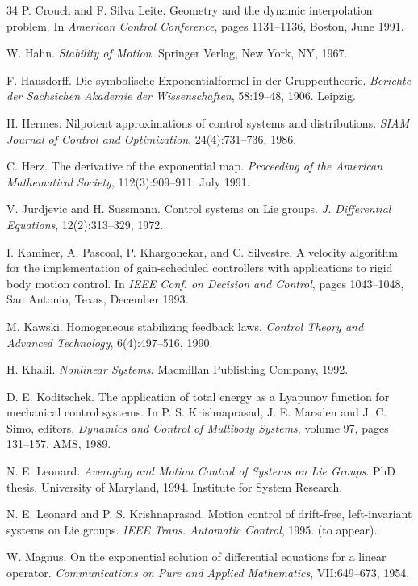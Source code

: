 \documentclass[11pt]{article}
\begin{document}
\begin{thebibliography}{34}
 P. Crouch and F. Silva Leite. Geometry and the dynamic interpolation problem. In \emph{American Control Conference}, pages 1131--1136, Boston, June 1991.

 W. Hahn. \emph{Stability of Motion}. Springer Verlag, New York, NY, 1967.

 F. Hausdorff. Die symbolische Exponentialformel in der Gruppentheorie. \emph{Berichte der Sachsichen Akademie der Wissenschaften}, 58:19--48, 1906. Leipzig.

 H. Hermes. Nilpotent approximations of control systems and distributions. \emph{SIAM Journal of Control and Optimization}, 24(4):731--736, 1986.

 C. Herz. The derivative of the exponential map. \emph{Proceeding of the American Mathematical Society}, 112(3):909--911, July 1991.

 V. Jurdjevic and H. Sussmann. Control systems on Lie groups. \emph{J. Differential Equations}, 12(2):313--329, 1972.

 I. Kaminer, A. Pascoal, P. Khargonekar, and C. Silvestre. A velocity algorithm for the implementation of gain-scheduled controllers with applications to rigid body motion control. In \emph{IEEE Conf. on Decision and Control}, pages 1043--1048, San Antonio, Texas, December 1993.

 M. Kawski. Homogeneous stabilizing feedback laws. \emph{Control Theory and Advanced Technology}, 6(4):497--516, 1990.

 H. Khalil. \emph{Nonlinear Systems}. Macmillan Publishing Company, 1992.

 D. E. Koditschek. The application of total energy as a Lyapunov function for mechanical control systems. In P. S. Krishnaprasad, J. E. Marsden and J. C. Simo, editors, \emph{Dynamics and Control of Multibody Systems}, volume 97, pages 131--157. AMS, 1989.

 N. E. Leonard. \emph{Averaging and Motion Control of Systems on Lie Groups}. PhD thesis, University of Maryland, 1994. Institute for System Research.

 N. E. Leonard and P. S. Krishnaprasad. Motion control of drift-free, left-invariant systems on Lie groups. \emph{IEEE Trans. Automatic Control}, 1995. (to appear).

 W. Magnus. On the exponential solution of differential equations for a linear operator. \emph{Communications on Pure and Applied Mathematics}, VII:649--673, 1954.


\end{thebibliography}
\end{document}
